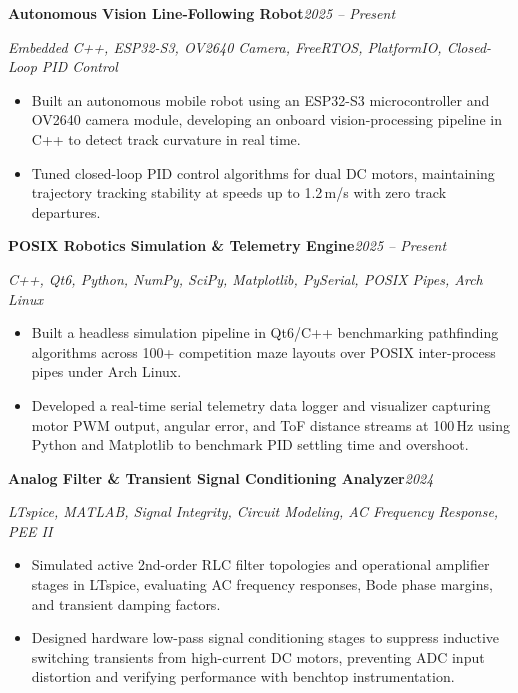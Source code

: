 \documentclass[10pt]{article}
\newcommand{\RoleDates}[2]{\noindent\textit{#1}\hfill\textit{#2}\par}
\newcommand{\ProjectHeading}[2]{\noindent\textbf{#1}\hfill\textit{#2}\par}
\begin{document}
\vspace{3.5pt}
\ProjectHeading{Autonomous Vision Line-Following Robot}{2025 -- Present}
\RoleDates{Embedded C++, ESP32-S3, OV2640 Camera, FreeRTOS, PlatformIO, Closed-Loop PID Control}{}
\begin{itemize}
  \item Built an autonomous mobile robot using an ESP32-S3 microcontroller and OV2640 camera module, developing an onboard vision-processing pipeline in C++ to detect track curvature in real time.
  \item Tuned closed-loop PID control algorithms for dual DC motors, maintaining trajectory tracking stability at speeds up to 1.2\,m/s with zero track departures.
\end{itemize}

\vspace{3.5pt}
\ProjectHeading{POSIX Robotics Simulation \& Telemetry Engine}{2025 -- Present}
\RoleDates{C++, Qt6, Python, NumPy, SciPy, Matplotlib, PySerial, POSIX Pipes, Arch Linux}{}
\begin{itemize}
  \item Built a headless simulation pipeline in Qt6/C++ benchmarking pathfinding algorithms across 100+ competition maze layouts over POSIX inter-process pipes under Arch Linux.
  \item Developed a real-time serial telemetry data logger and visualizer capturing motor PWM output, angular error, and ToF distance streams at 100\,Hz using Python and Matplotlib to benchmark PID settling time and overshoot.
\end{itemize}

\vspace{3.5pt}
\ProjectHeading{Analog Filter \& Transient Signal Conditioning Analyzer}{2024}
\RoleDates{LTspice, MATLAB, Signal Integrity, Circuit Modeling, AC Frequency Response, PEE II}{}
\begin{itemize}
  \item Simulated active 2nd-order RLC filter topologies and operational amplifier stages in LTspice, evaluating AC frequency responses, Bode phase margins, and transient damping factors.
  \item Designed hardware low-pass signal conditioning stages to suppress inductive switching transients from high-current DC motors, preventing ADC input distortion and verifying performance with benchtop instrumentation.
\end{itemize}
\end{document}
